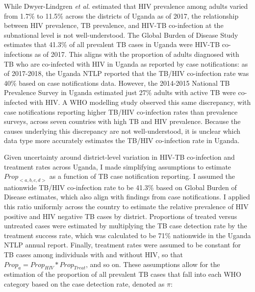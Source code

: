 \documentclass[
]{report}
\begin{document}
While Dwyer-Lindgren \emph{et al.} estimated that HIV prevalence among adults varied from 1.7\% to 11.5\% across the districts of Uganda as of 2017,\autocite{Dwyer-Lindgren2019} the relationship between HIV prevalence, TB prevalence, and HIV-TB co-infection at the subnational level is not well-understood. The Global Burden of Disease Study estimates that 41.3\% of all prevalent TB cases in Uganda were HIV-TB co-infections as of 2017.\autocite{Ledesma2021} This aligns with the proportion of adults diagnosed with TB who are co-infected with HIV in Uganda as reported by case notifications: as of 2017-2018, the Uganda NTLP reported that the TB/HIV co-infection rate was 40\% based on case notifications data.\autocite{UgandaNationalTuberculosisandLeprosyProgramme2018} However, the 2014-2015 National TB Prevalence Survey in Uganda estimated just 27\% adults with active TB were co-infected with HIV. A WHO modelling study observed this same discrepancy, with case notifications reporting higher TB/HIV co-infection rates than prevalence surveys, across seven countries with high TB and HIV prevalence.\autocite{Glaziou2019} Because the causes underlying this discrepancy are not well-understood, it is unclear which data type more accurately estimates the TB/HIV co-infection rate in Uganda.

Given uncertainty around district-level variation in HIV-TB co-infection and treatment rates across Uganda, I made simplifying assumptions to estimate \(Prop_{<a,b,c,d>}\) as a function of TB case notification reporting. I assumed the nationwide TB/HIV co-infection rate to be 41.3\% based on Global Burden of Disease estimates, which also align with findings from case notifications.\autocite{Ledesma2021} I applied this ratio uniformly across the country to estimate the relative prevalence of HIV positive and HIV negative TB cases by district. Proportions of treated versus untreated cases were estimated by multiplying the TB case detection rate by the treatment success rate, which was calculated to be 71\% nationwide in the Uganda NTLP annual report.\autocite{UgandaNationalTuberculosisandLeprosyProgramme2018} Finally, treatment rates were assumed to be constant for TB cases among individuals with and without HIV, so that \(Prop_a = Prop_{HIV} * Prop_{Treat}\), and so on. These assumptions allow for the estimation of the proportion of all prevalent TB cases that fall into each WHO category based on the case detection rate, denoted as \(\pi\):
\end{document}
